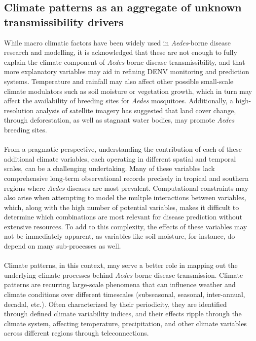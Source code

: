 \documentclass[10pt,twocolumn]{wlscirep}
\begin{document}
\subsection{Climate patterns as an aggregate of unknown transmissibility drivers} \label{sec-climate-patterns}

While macro climatic factors have been widely used in \textit{Aedes}-borne disease research and modelling\cite{caminade_2017, liu-helmersson_2014, mordecai_2017, wesolowski_2015}, it is acknowledged that these are not enough to fully explain the climate component of \textit{Aedes}-borne disease transmissibility, and that more explanatory variables may aid in refining DENV monitoring and prediction systems\cite{erraguntla_2021, lee_2017, yavarinejad_2021, sriklin_2021}. Temperature and rainfall may also affect other possible small-scale climate modulators such as soil moisture or vegetation growth, which in turn may affect the availability of breeding sites for \textit{Aedes} mosquitoes. Additionally, a high-resolution analysis of satellite imagery has suggested that land cover change, through deforestation, as well as stagnant water bodies, may promote \textit{Aedes} breeding sites\cite{ali_2025}.
\\
\\
From a pragmatic perspective, understanding the contribution of each of these additional climate variables, each operating in different spatial and temporal scales, can be a challenging undertaking. Many of these variables lack comprehensive long-term observational records precisely in tropical and southern regions where \textit{Aedes} diseases are most prevalent\cite{shaw_2024, senroy_2018}. Computational constraints may also arise when attempting to model the multple interactions between variables, which, along with the high number of potential variables, makes it difficult to determine which combinations are most relevant for disease prediction without extensive resources. To add to this complexity, the effects of these variables may not be immediately apparent, as variables like soil moisture, for instance, do depend on many sub-processes as well\cite{peng_2023}.
\\
\\
Climate patterns, in this context, may serve a better role in mapping out the underlying climate processes behind \textit{Aedes}-borne disease transmission. Climate patterns are recurring large-scale phenomena that can influence weather and climate conditions over different timescales (subseasonal, seasonal, inter-annual, decadal, etc.). Often characterized by their periodicity, they are identified through defined climate variability indices, and their effects ripple through the climate system, affecting temperature, precipitation, and other climate variables across different regions through teleconnections\cite{lubbecke_2018}.
\end{document}
